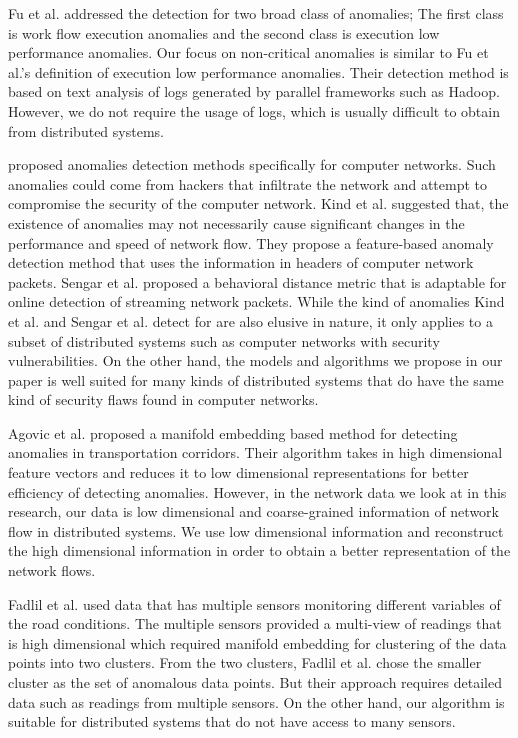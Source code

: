 \documentclass[conference]{IEEEtran.1.8}
\begin{document}
Fu et al. \cite{Fu2009} addressed the detection for two broad class of anomalies; The first class is work flow execution anomalies and the second class is execution low performance anomalies. Our focus on non-critical anomalies is similar to Fu et al.'s definition of execution low performance anomalies. Their detection method is based on text analysis of logs generated by parallel frameworks such as Hadoop. However, we do not require the usage of logs, which is usually difficult to obtain from distributed systems.

\cite{Kind2009, Sengar2009} proposed anomalies detection methods specifically for computer networks. Such anomalies could come from hackers that infiltrate the network and attempt to compromise the security of the computer network. Kind et al. \cite{Kind2009} suggested that, the existence of anomalies may not necessarily cause significant changes in the performance and speed of network flow. They propose a feature-based anomaly detection method that uses the information in headers of computer network packets. Sengar et al. \cite{Sengar2009} proposed a behavioral distance metric that is adaptable for online detection of streaming network packets. While the kind of anomalies Kind et al. \cite{Kind2009} and Sengar et al. \cite{Sengar2009} detect for are also elusive in nature, it only applies to a subset of distributed systems such as computer networks with security vulnerabilities. On the other hand, the models and algorithms we propose in our paper is well suited for many kinds of distributed systems that do have the same kind of security flaws found in computer networks.

Agovic et al. \cite{Agovic2009} proposed a manifold embedding based method for detecting anomalies in transportation corridors. Their algorithm takes in high dimensional feature vectors and reduces it to low dimensional representations for better efficiency of detecting anomalies. However, in the network data we look at in this research, our data is low dimensional and coarse-grained information of network flow in distributed systems. We use low dimensional information and reconstruct the high dimensional information in order to obtain a better representation of the network flows.

Fadlil et al. \cite{Fadlil2013} used data that has multiple sensors monitoring different variables of the road conditions. The multiple sensors provided a multi-view of readings that is high dimensional which required manifold embedding \cite{Agovic2009} for clustering of the data points into two clusters. From the two clusters, Fadlil et al. chose the smaller cluster as the set of anomalous data points. But their approach requires detailed data such as readings from multiple sensors. On the other hand, our algorithm is suitable for distributed systems that do not have access to many sensors.
\end{document}
